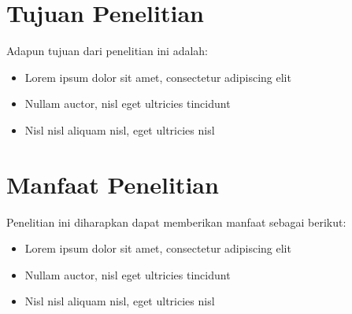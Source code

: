 \section{Tujuan Penelitian}
Adapun tujuan dari penelitian ini adalah:
\begin{itemize}
    \item Lorem ipsum dolor sit amet, consectetur adipiscing elit
    \item Nullam auctor, nisl eget ultricies tincidunt
    \item Nisl nisl aliquam nisl, eget ultricies nisl
\end{itemize}

\section{Manfaat Penelitian}
Penelitian ini diharapkan dapat memberikan manfaat sebagai berikut:
\begin{itemize}
    \item Lorem ipsum dolor sit amet, consectetur adipiscing elit
    \item Nullam auctor, nisl eget ultricies tincidunt
    \item Nisl nisl aliquam nisl, eget ultricies nisl
\end{itemize}